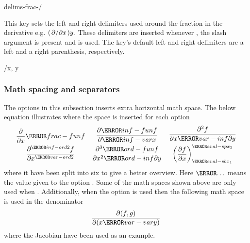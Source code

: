 \begin{option}{delims-frac-/}
	\begin{values}[default = (~)]
	\end{values}
	This key sets the left and right delimiters used around the fraction in the derivative e.g. $\pdv*[frac=true]{y}/{x}$. These delimiters are inserted whenever , the slash argument is present and  is used. The key's default left and right delimiters are a left and a right parenthesis, respectively.
	\begin{example}
		/{x, y}
	\end{example}
\end{option}

\subsubsection*{Math spacing and separators}
The options in this subsection inserts extra horizontal math space. The below equation illustrates where the space is inserted for each option
\begin{align*}
	\begin{gathered}
		\frac{ \partial }{ \partial x } \ms{frac-fun} f \\
		\frac{ \partial^{ \ms{inf-ord} 2 } f }{ \partial x^{ \ms{var-ord} 2 } }
	\end{gathered}
	&&
	\begin{gathered}
		\frac{ \partial \ms{inf-fun} f }{ \partial \ms{inf-var} x } \\
		\frac{ \partial^3 \ms{ord-fun} f }{ \partial x^2 \ms{ord-inf} \partial y }
	\end{gathered}
	&&
	\begin{gathered}
		\frac{ \partial^2 f }{ \partial x \ms{var-inf} \partial y }   \\
		\mleft( \frac{ \partial f}{ \partial x } \mright)_{ \ms{eval-sb} x_1}^{ \ms{eval-sp} x_2}
	\end{gathered}
\end{align*}
where it have been split into six to give a better overview. Here $\ms{\dots}$ means the value given to the option . Some of the math spaces shown above are only used when . Additionally, when the option  is used then the following math space is used in the denominator
\begin{equation*}
	\frac{\partial(f, g)}{\partial(x \ms{var-var} y)}
\end{equation*}
where the Jacobian have been used as an example.


